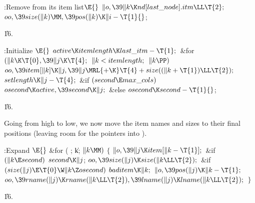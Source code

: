\B{}:Remove  from its item list\X${}\E{}$\6
$\|o,\39\|k\K\\{nd}[\\{last\_node}].\\{itm}\LL\T{2};{}$\6
${}\\{oo},\39\\{size}(\|k)\MM,\39\\{pos}(\|k)\K\|i-\T{1}{}$;\par
\U16.\fi

\B{}:Initialize \X${}\E{}$\6
$\\{active}\K\\{itemlength}\K\\{last\_itm}-\T{1};{}$\6
\&{for} ${}(\|k\K\T{0},\39\|j\K\T{4};{}$ ${}\|k<\\{itemlength};{}$ ${}\|k%
\PP){}$\1\5
${}\\{oo},\39\\{item}[\|k]\K\|j,\39\|j\MRL{+{\K}}\T{4}+\\{size}((\|k+\T{1})\LL%
\T{2});{}$\2\6
${}\\{setlength}\K\|j-\T{4};{}$\6
\&{if} ${}(\\{second}\E\\{max\_cols}){}$\1\5
${}\\{osecond}\K\\{active},\39\\{second}\K\|j;{}$\2\6
\&{else}\1\5
${}\\{osecond}\K\\{second}-\T{1}{}$;\2\par
\U16.\fi

Going from high to low, we now move the item names and sizes
to their final positions (leaving room for the pointers into ).

\Y\B\4:Expand \X${}\E{}$\6
\&{for} ( ; \|k; ${}\|k\MM){}$\5
${}\{{}$\1\6
${}\|o,\39\|j\K\\{item}[\|k-\T{1}];{}$\6
\&{if} ${}(\|k\E\\{second}){}$\1\5
${}\\{second}\K\|j{}$;\2%
\6
${}\\{oo},\39\\{size}(\|j)\K\\{size}(\|k\LL\T{2});{}$\6
\&{if} ${}(\\{size}(\|j)\E\T{0}\W\|k\Z\\{osecond}){}$\1\5
${}\\{baditem}\K\|k;{}$\2\6
${}\|o,\39\\{pos}(\|j)\K\|k-\T{1};{}$\6
${}\\{oo},\39\\{rname}(\|j)\K\\{rname}(\|k\LL\T{2}),\39\\{lname}(\|j)\K%
\\{lname}(\|k\LL\T{2});{}$\6
\4${}\}{}$\2\par
\U16.\fi

